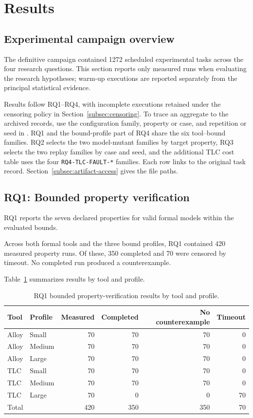 \section{Results}
\label{sec:results}

\subsection{Experimental campaign overview}
\label{subsec:results-overview}

The definitive campaign contained 1272 scheduled experimental tasks
across the four research questions. This section reports only measured
runs when evaluating the research hypotheses; warm-up executions are
reported separately from the principal statistical evidence.

Results follow RQ1--RQ4, with incomplete executions retained under the
censoring policy in Section~\ref{subsec:censoring}. To trace an aggregate
to the archived records, use the configuration family, property or case,
and repetition or seed in .
RQ1 and the bound-profile part of RQ4 share the six tool--bound families.
RQ2 selects the two model-mutant families by target property, RQ3 selects
the two replay families by case and seed, and the additional TLC cost
table uses the four \texttt{RQ4-TLC-FAULT-*} families. Each row links to
the original task record. Section~\ref{subsec:artifact-access} gives the
file paths.

\subsection{RQ1: Bounded property verification}
\label{subsec:rq1-results}

RQ1 reports the seven declared properties for valid formal models within
the evaluated bounds.

Across both formal tools and the three bound profiles, RQ1 contained
420 measured property runs. Of these, 350 completed and 70 were
censored by timeout. No completed run produced a counterexample.

Table~\ref{tab:rq1-summary} summarizes results by tool and profile.

\begin{table}[htbp]
\centering
\caption{RQ1 bounded property-verification results by tool and profile.}
\label{tab:rq1-summary}
\begin{tabular}{llrrrr}
\hline
Tool & Profile & Measured & Completed & No counterexample & Timeout \\
\hline
Alloy & Small  & 70 & 70 & 70 & 0  \\
Alloy & Medium & 70 & 70 & 70 & 0  \\
Alloy & Large  & 70 & 70 & 70 & 0  \\
TLC   & Small  & 70 & 70 & 70 & 0  \\
TLC   & Medium & 70 & 70 & 70 & 0  \\
TLC   & Large  & 70 & 0  & 0  & 70 \\
\hline
Total &        & 420 & 350 & 350 & 70 \\
\hline
\end{tabular}
\end{table}

